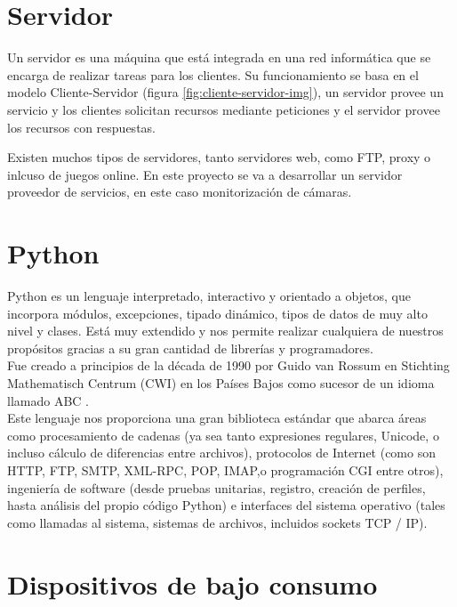 \section{Servidor}

Un servidor es una máquina que está integrada en una red informática que se encarga de realizar tareas para los clientes. Su funcionamiento se basa en el modelo Cliente-Servidor (figura \ref{fig:cliente-servidor-img}), un servidor provee un servicio y los clientes solicitan recursos mediante peticiones y el servidor provee los recursos con respuestas.


Existen muchos tipos de servidores, tanto servidores web, como FTP, proxy o inlcuso de juegos online. En este proyecto se va a desarrollar un servidor proveedor de servicios, en este caso monitorización de cámaras.



\section{Python}

Python \cite{python} es un lenguaje interpretado, interactivo y orientado a objetos, que incorpora módulos, excepciones, tipado dinámico, tipos de datos de muy alto nivel y clases. Está muy extendido y nos permite realizar cualquiera de nuestros propósitos gracias a su gran cantidad de librerías y programadores. \\
Fue creado a principios de la década de 1990 por Guido van Rossum en Stichting Mathematisch Centrum (CWI) en los Países Bajos como sucesor de un idioma llamado ABC \cite{pythonhistory}. \\
Este lenguaje \cite{python} nos proporciona una gran biblioteca estándar que abarca áreas como procesamiento de cadenas (ya sea tanto expresiones regulares, Unicode, o incluso cálculo de diferencias entre archivos), protocolos de Internet (como son HTTP, FTP, SMTP, XML-RPC, POP, IMAP,o programación CGI entre otros), ingeniería de software (desde pruebas unitarias, registro, creación de perfiles, hasta análisis del propio código Python) e interfaces del sistema operativo (tales como llamadas al sistema, sistemas de archivos, incluidos sockets TCP / IP).



\section{Dispositivos de bajo consumo}

